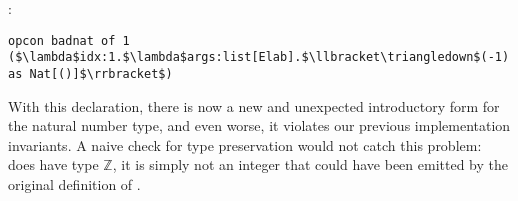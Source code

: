 %
%
%    
%
%
%  
%
%
%

%

:

\begin{lstlisting}
opcon badnat of 1 ($\lambda$idx:1.$\lambda$args:list[Elab].$\llbracket\triangledown$(-1) as Nat[()]$\rrbracket$)
\end{lstlisting}

With this declaration, there is now a new and unexpected introductory form for the natural number type, and even worse, it violates our previous implementation invariants. A naive check for type preservation would not catch this problem:  does have type $\mathbb{Z}$, it is simply not an integer that could have been emitted by the original definition of .

